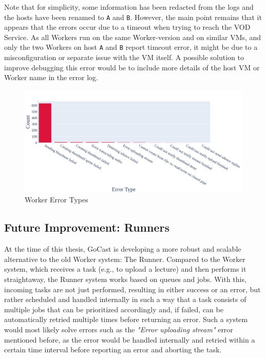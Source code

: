 Note that for simplicity, some information has been redacted from the logs and the hosts have been renamed to \texttt{A} and \texttt{B}. However, the main point remains that it appears that the errors occur due to a timeout when trying to reach the VOD Service. As all Workers run on the same Worker-version and on similar \ac{VM}s, and only the two Workers on host \texttt{A} and \texttt{B} report timeout error, it might be due to a misconfiguration or separate issue with the \ac{VM} itself. A possible solution to improve debugging this error would be to include more details of the host \ac{VM} or Worker name in the error log. 

\begin{figure}[htpb]
    \centering
    \includegraphics[width=\linewidth]{images/plots/worker/error_types.png}
    \caption[Worker Error Types]{Worker Error Types}\label{fig:worker-error-types}
\end{figure}

\subsection{Future Improvement: Runners}\label{subsection:runner}

At the time of this thesis, GoCast is developing a more robust and scalable alternative to the old Worker system: The Runner. Compared to the Worker system, which receives a task (e.g., to upload a lecture) and then performs it straightaway, the Runner system works based on queues and jobs. With this, incoming tasks are not just performed, resulting in either success or an error, but rather scheduled and handled internally in such a way that a task consists of multiple jobs that can be prioritized accordingly and, if failed, can be automatically retried multiple times before returning an error. Such a system would most likely solve errors such as the \textit{"Error uploading stream"} error mentioned before, as the error would be handled internally and retried within a certain time interval before reporting an error and aborting the task.

